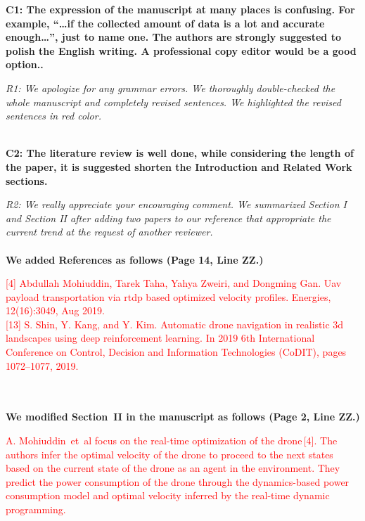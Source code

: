 \documentclass[onecolumn]{IEEEconf}
\begin{document}
\begin{description}
    \item \textbf
	{
	C1: The expression of the manuscript at many places is confusing. For example, “…if the collected amount of data is a lot and accurate enough…”, just to name one. The authors are strongly suggested to polish the English writing.  A professional copy editor would be a good option..
	}
	\item \textit
	{
	R1: We apologize for any grammar errors. We thoroughly double-checked the whole manuscript and completely revised sentences. We highlighted the revised sentences in red color.  
	}
	~\\
    ~\\
    \item \textbf
    {
	C2: The literature review is well done, while considering the length of the paper, it is suggested shorten the Introduction and Related Work sections.
	}
	\item \textit
	{
	R2: We really appreciate your encouraging comment. We summarized Section I and Section II after adding two papers to our reference that appropriate the current trend at the request of another reviewer.
	}
	~\\
    ~\\
	\textbf{We added References as follows (Page 14, Line ZZ.)}
    \begin{mdframed} [ linewidth=.75pt, userdefinedwidth=0.9\textwidth]
    \textcolor{red}{[4] Abdullah Mohiuddin, Tarek Taha, Yahya Zweiri, and Dongming Gan. Uav payload transportation via rtdp  based optimized velocity profiles. Energies, 12(16):3049, Aug 2019.} \\
    \textcolor{red}{[13] S. Shin, Y. Kang, and Y. Kim. Automatic drone navigation in realistic 3d landscapes using deep reinforcement learning. In 2019 6th International Conference on Control, Decision and Information Technologies (CoDIT), pages 1072–1077, 2019.}
    \end{mdframed} 
    ~\\
    ~\\
	\textbf{We modified Section~II in the manuscript as follows (Page 2, Line ZZ.)}
    \begin{mdframed} [ linewidth=.75pt, userdefinedwidth=0.9\textwidth]
    \textcolor{red}{A. Mohiuddin~et~al focus on the real-time optimization of the drone\,[4]. 
    The authors infer the optimal velocity of the drone to proceed to the next states based on the current state of the drone as an agent in the environment.
    They predict the power consumption of the drone through the dynamics-based power consumption model and optimal velocity inferred by the real-time dynamic programming.
}
\end{mdframed}
\end{description}
\end{document}

